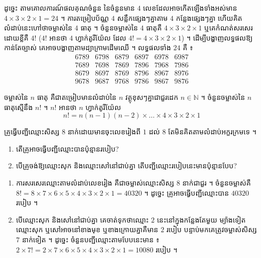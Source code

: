 ដូច្នេះ តាមគោលការណ៍ផលគុណចំនួន នៃចំនួនមាន $4$ លេខដែលអាចកើតឡើងទាំងអស់មាន $4\times 3\times 2\times 1 = 24$ ។ ការតម្រៀបប័ណ្ណ $4$ សន្លឹកផ្សេងៗគ្នាតាម $4$ កន្លែងផ្សេងៗគ្នា ហើយគិតលំដាប់នេះហៅថាចម្លាស់នៃ $4$ ធាតុ ។ ចំនួនចម្លាស់នៃ $4$ ធាតុគឺ $4\times 3\times 2\times 1$ ឬគេកំណត់សរសេរដោយខ្លីគឺ $4!$ ($4!$ អានថា $4$ ហ្វាក់តូរីយ៉ែល ដែល $4! = 4\times 3\times 2\times 1$) ។ ដើម្បីបង្ហាញលទ្ធផលឱ្យកាន់តែច្បាស់ គេអាចបង្ហាញតាមដ្យាក្រាមដើមឈើ ។ លទ្ធផលទាំង $24$ គឺ ៖
\[
\begin{array}{cccccc}
6789 & 6798 & 6879 & 6897 & 6978 & 6987\\
7689 & 7698 & 7869 & 7896 & 7968 & 7986\\
8679 & 8697 & 8769 & 8796 & 8967 & 8976\\
9678 & 9687 & 9768 & 9786 & 9867 & 9876
\end{array}
\]

\begin{formulaBox}[ជាទូទៅ]
ចម្លាស់នៃ $n$ ធាតុ គឺជាតម្រៀបមានលំដាប់នៃ $n$ វត្ថុខុសៗគ្នាជាជួរដេក $n \in \mathbb{N}$ ។ ចំនួនចម្លាស់នៃ $n$ ធាតុស្មើនឹង $n!$ ។ $n!$ អានថា $n$ ហ្វាក់តូរីយ៉ែល
\[ n! = n(n - 1)(n - 2)\times\dots\times 4\times 3\times 2\times 1 \]
\end{formulaBox}

\begin{example}[លំហាត់គំរូ]
គ្រូធ្វើបញ្ជីឈ្មោះសិស្ស $8$ នាក់ដោយមានចុះលេខរៀងពី $1$ ដល់ $8$ តែមិនគិតតាមលំដាប់អក្ខរក្រមទេ ។
\begin{enumerate}[a]
  \item តើគ្រូអាចធ្វើបញ្ជីឈ្មោះបានប៉ុន្មានរបៀប?
  \item បើគ្រូចង់ឱ្យឈ្មោះសុក និងឈ្មោះសៅនៅជាប់គ្នា តើបញ្ជីឈ្មោះរបៀបនេះមានប៉ុន្មានបែប?
\end{enumerate}
\end{example}
\ans
\begin{enumerate}[a]
  \item ការសរសេរឈ្មោះតាមលំដាប់លេខរៀង គឺជាចម្លាស់ឈ្មោះសិស្ស $8$ នាក់ជាជួរ ។ ចំនួនចម្លាស់គឺ $8! = 8\times 7\times 6\times 5\times 4\times 3\times 2\times 1 = 40320$ ។ ដូច្នេះ គ្រូអាចធ្វើបញ្ជីឈ្មោះបាន $40320$ របៀប ។
  \item បើឈ្មោះសុក និងសៅនៅជាប់គ្នា គេចាត់ទុកថាឈ្មោះ $2$ នេះនៅក្នុងកន្លែងតែមួយ ម្យ៉ាងទៀតឈ្មោះសុក ឬសៅអាចនៅខាងមុខ ឬខាងក្រោយគ្នាគឺមាន $2$ របៀប បន្ទាប់មកគេត្រូវចម្លាស់សិស្ស $7$ នាក់ទៀត ។ ដូច្នេះ ចំនួនបញ្ជីឈ្មោះតាមបែបនេះមាន ៖ $2\times 7! = 2\times 7\times 6\times 5\times 4\times 3\times 2\times 1 = 10080$ របៀប ។
\end{enumerate}

